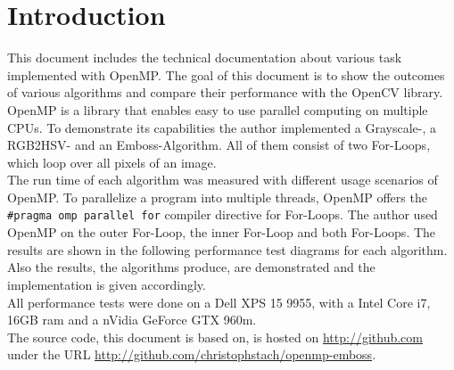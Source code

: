 \chapter{Introduction}

This document includes the technical documentation about various task implemented with OpenMP. The goal of this document is to show the outcomes of various algorithms and compare their performance with the OpenCV library. OpenMP is a library that enables easy to use parallel computing on multiple CPUs. To demonstrate its capabilities the author implemented a Grayscale-, a RGB2HSV- and an Emboss-Algorithm. All of them consist of two For-Loops, which loop over all pixels of an image.\\

The run time of each algorithm was measured with different usage scenarios of OpenMP. To parallelize a program into multiple threads, OpenMP offers the \texttt{#pragma omp parallel for} compiler directive for For-Loops.  The author used OpenMP on the outer For-Loop, the inner For-Loop and both For-Loops. The results are shown in the following performance test diagrams for each algorithm. Also the results, the algorithms produce, are demonstrated and the implementation is given accordingly.\\

All performance tests were done on a Dell XPS 15 9955, with a Intel Core i7, 16GB ram and a nVidia GeForce GTX 960m.\\

The source code, this document is based on, is hosted on \url{http://github.com} under the URL \url{http://github.com/christophstach/openmp-emboss}.

